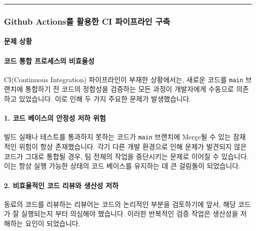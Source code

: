 \documentclass[12pt,a4paper]{article}
\newcommand{\divider}{%
    \vspace{0.5cm}%
    \begin{center}%
    \textcolor{lightgray}{\rule{0.2\textwidth}{0.5pt}}%
    \end{center}%
    \vspace{0.5cm}%
}
\begin{document}
    \divider
    \subsubsection{Github Actions를 활용한 CI 파이프라인 구축}


    \paragraph{문제 상황}

    \paragraph{코드 통합 프로세스의 비효율성} \par
    CI(Continuous Integration) 파이프라인이 부재한 상황에서는, 새로운 코드를 \texttt{main} 브랜치에 통합하기 전 코드의 정합성을 검증하는 모든 과정이 개발자에게 수동으로 의존하고 있었습니다. 이로 인해 두 가지 주요한 문제가 발생했습니다.\\

    \vspace{1em}


    \paragraph{1. 코드 베이스의 안정성 저하 위험} \par
    빌드 실패나 테스트를 통과하지 못하는 코드가 \texttt{main} 브랜치에 Merge될 수 있는 잠재적인 위험이 항상 존재했습니다. 각기 다른 개발 환경으로 인해 문제가 발견되지 않은 코드가 그대로 통합될 경우, 팀 전체의 작업을 중단시키는 문제로 이어질 수 있습니다. 이는 항상 실행 가능한 상태의 코드 베이스를 유지하는 데 큰 걸림돌이 되었습니다.\\

    \vspace{1em}


    \paragraph{2. 비효율적인 코드 리뷰와 생산성 저하} \par
    동료의 코드를 리뷰하는 리뷰어는 코드의 논리적인 부분을 검토하기에 앞서, 해당 코드가 잘 실행되는지 부터 의심해야 했습니다. 이러한 반복적인 검증 작업은 생산성을 저해하는 요인이 되었습니다.\\
\end{document}
